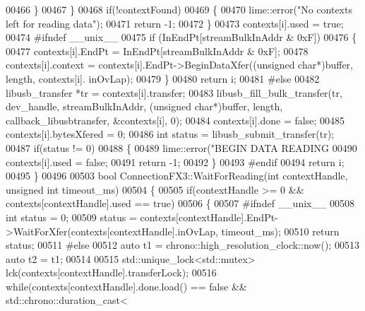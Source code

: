 \begin{DoxyCode}
{{00466         \}
00467     \}
00468     \textcolor{keywordflow}{if}(!contextFound)
00469     \{
00470         lime::error(\textcolor{stringliteral}{"No contexts left for reading data"});
00471         \textcolor{keywordflow}{return} -1;
00472     \}
00473     contexts[i].used = \textcolor{keyword}{true};
00474 \textcolor{preprocessor}{    #ifndef \_\_unix\_\_}
00475     \textcolor{keywordflow}{if} (InEndPt[streamBulkInAddr & 0xF])
00476     \{
00477         contexts[i].EndPt = InEndPt[streamBulkInAddr & 0xF];
00478         contexts[i].context = contexts[i].EndPt->BeginDataXfer((\textcolor{keywordtype}{unsigned} \textcolor{keywordtype}{char}*)buffer, length, contexts[i].
      inOvLap);
00479     \}
00480     \textcolor{keywordflow}{return} i;
00481 \textcolor{preprocessor}{    #else}
00482     libusb\_transfer *tr = contexts[i].transfer;
00483     libusb\_fill\_bulk\_transfer(tr, dev\_handle, streamBulkInAddr, (\textcolor{keywordtype}{unsigned} \textcolor{keywordtype}{char}*)buffer, length, 
      callback\_libusbtransfer, &contexts[i], 0);
00484     contexts[i].done = \textcolor{keyword}{false};
00485     contexts[i].bytesXfered = 0;
00486     \textcolor{keywordtype}{int} status = libusb\_submit\_transfer(tr);
00487     \textcolor{keywordflow}{if}(status != 0)
00488     \{
00489         lime::error(\textcolor{stringliteral}{"BEGIN DATA READING %
00490         contexts[i].used = \textcolor{keyword}{false};
00491         \textcolor{keywordflow}{return} -1;
00492     \}
00493 \textcolor{preprocessor}{    #endif}
00494     \textcolor{keywordflow}{return} i;
00495 \}
00496 
00503 \textcolor{keywordtype}{bool} ConnectionFX3::WaitForReading(\textcolor{keywordtype}{int} contextHandle, \textcolor{keywordtype}{unsigned} \textcolor{keywordtype}{int} timeout_ms)
00504 \{
00505     \textcolor{keywordflow}{if}(contextHandle >= 0 && contexts[contextHandle].used == \textcolor{keyword}{true})
00506     \{
00507 \textcolor{preprocessor}{    #ifndef \_\_unix\_\_}
00508     \textcolor{keywordtype}{int} status = 0;
00509     status = contexts[contextHandle].EndPt->WaitForXfer(contexts[contextHandle].inOvLap, timeout\_ms);
00510     \textcolor{keywordflow}{return} status;
00511 \textcolor{preprocessor}{    #else}
00512     \textcolor{keyword}{auto} t1 = chrono::high\_resolution\_clock::now();
00513     \textcolor{keyword}{auto} t2 = t1;
00514 
00515     std::unique\_lock<std::mutex> lck(contexts[contextHandle].transferLock);
00516     \textcolor{keywordflow}{while}(contexts[contextHandle].done.load() == \textcolor{keyword}{false} && std::chrono::duration\_cast<
}}}
\end{DoxyCode}
